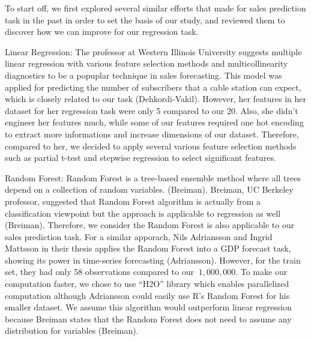 \documentclass[letterpaper,twocolumn,11pt]{article}
\begin{document}
To start off, we first explored several similar efforts that made for sales prediction task in the past in order to set the basis of our study, and reviewed them to discover how we can improve for our regression task. 

    Linear Regression: The professor at Western Illinois University suggests multiple linear regression with various feature selection methods and multicollinearity diagnostics to be a popuplar technique in sales forecasting. This model was applied for predicting the number of subscribers that a cable station can expect, which is closely related to our task (Dehkordi-Vakil). However, her features in her dataset for her regression task were only 5 compared to our 20. Also, she didn't engineer her features much, while some of our features required one hot encoding to extract more informations and increase dimensions of our dataset. Therefore, compared to her, we decided to apply several various feature selection methods such as partial t-test and stepwise regression to select significant features. 

    Random Forest: Random Forest is a tree-based ensemble method where all trees depend on a collection of random variables. (Breiman). Breiman, UC Berkeley professor, suggested that Random Forest algorithm is actually from a classification viewpoint but the approach is applicable to regression as well (Breiman). Therefore, we consider the Random Forest is also applicable to our sales prediction task. For a similar apporach, Nils Adriansson and Ingrid Mattsson in their thesis applies the Random Forest into a GDP forecast task, showing its power in time-series forecasting (Adriansson). However, for the train set, they had only 58 observations compared to our ${~1,000,000}$. To make our computation faster, we chose to use ``H2O'' library which enables parallelized computation although Adriansson could easily use R's Random Forest for his smaller dataset. We assume this algorithm would outperform linear regression because Breiman states that the Random Forest does not need to assume any distribution for variables (Breiman).
\end{document}
